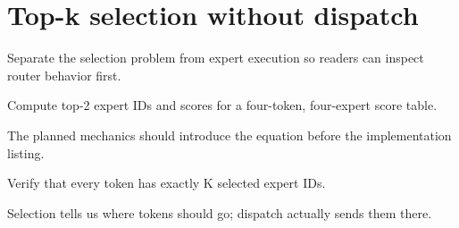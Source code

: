 \section{Top-k selection without dispatch}
\label{sec:ch03-top-k-selection-without-dispatch}

Separate the selection problem from expert execution so readers can inspect router behavior first.



Compute top-2 expert IDs and scores for a four-token, four-expert score table.



The planned mechanics should introduce the equation before the implementation listing.





\begin{checkpointbox}
Verify that every token has exactly K selected expert IDs.
\end{checkpointbox}

Selection tells us where tokens should go; dispatch actually sends them there.
